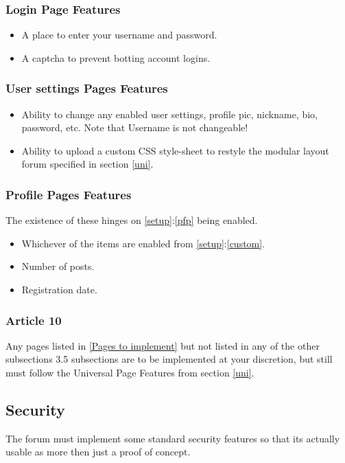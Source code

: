 \documentclass[]{article}
\begin{document}
\subsubsection{Login Page Features}
\begin{itemize}
    \item A place to enter your username and password.
    \item A captcha to prevent botting account logins.
\end{itemize}

\subsubsection{User settings Pages Features}
\begin{itemize}
    \item Ability to change any enabled user settings, profile pic, nickname, bio, password, etc. Note that Username is not changeable!
    \item Ability to upload a custom CSS style-sheet to restyle the modular layout forum specified in section \ref{uni}.
\end{itemize}


\subsubsection{Profile Pages Features}
The existence of these hinges on \ref{setup}:\ref{pfp} being enabled.
\begin{itemize}
    \item Whichever of the items are enabled from \ref{setup}:\ref{custom}.
    \item Number of posts.
    \item Registration date.
\end{itemize}

\subsubsection{Article 10}
Any pages listed in \ref{Pages to implement} but not listed in any of the other subsections 3.5 subsections are to be implemented at your discretion, but still must follow the Universal Page Features from section \ref{uni}.

\newpage
\subsection{Security}
The forum must implement some standard security features so that its actually usable as more then just a proof of concept. 
\end{document}
